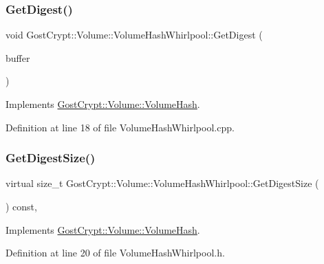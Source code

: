 \subsubsection{\texorpdfstring{Get\+Digest()}{GetDigest()}}
{\footnotesize\ttfamily void Gost\+Crypt\+::\+Volume\+::\+Volume\+Hash\+Whirlpool\+::\+Get\+Digest (\begin{DoxyParamCaption}\item[{\hyperlink{class_gost_crypt_1_1_buffer_ptr}{Buffer\+Ptr} \&}]{buffer }\end{DoxyParamCaption})\hspace{0.3cm}{\ttfamily [virtual]}}



Implements \hyperlink{class_gost_crypt_1_1_volume_1_1_volume_hash_a8ae75f9cc4beea8ecb8751ecb221c797}{Gost\+Crypt\+::\+Volume\+::\+Volume\+Hash}.



Definition at line 18 of file Volume\+Hash\+Whirlpool.\+cpp.

\mbox{\label{class_gost_crypt_1_1_volume_1_1_volume_hash_whirlpool_aa43208ea8d58349c7508b090c4c1f888}} 
\subsubsection{\texorpdfstring{Get\+Digest\+Size()}{GetDigestSize()}}
{\footnotesize\ttfamily virtual size\+\_\+t Gost\+Crypt\+::\+Volume\+::\+Volume\+Hash\+Whirlpool\+::\+Get\+Digest\+Size (\begin{DoxyParamCaption}{ }\end{DoxyParamCaption}) const\hspace{0.3cm}{\ttfamily [inline]}, {\ttfamily [virtual]}}



Implements \hyperlink{class_gost_crypt_1_1_volume_1_1_volume_hash_a3677448f436ac856778274dafdc36ed4}{Gost\+Crypt\+::\+Volume\+::\+Volume\+Hash}.



Definition at line 20 of file Volume\+Hash\+Whirlpool.\+h.

\mbox{\label{class_gost_crypt_1_1_volume_1_1_volume_hash_whirlpool_a84fbe785c799795ead9a7154deb54c3c}} 
